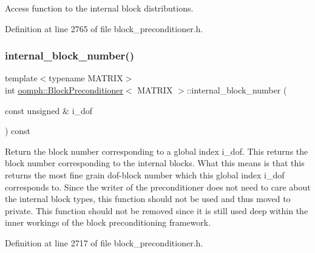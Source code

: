 Access function to the internal block distributions. 



Definition at line 2765 of file block\+\_\+preconditioner.\+h.

\mbox{\label{classoomph_1_1BlockPreconditioner_af3eadb5d8d36200c4738537eac1647a6}} 
\subsubsection{\texorpdfstring{internal\+\_\+block\+\_\+number()}{internal\_block\_number()}}
{\footnotesize\ttfamily template$<$typename M\+A\+T\+R\+IX$>$ \\
int \hyperlink{classoomph_1_1BlockPreconditioner}{oomph\+::\+Block\+Preconditioner}$<$ M\+A\+T\+R\+IX $>$\+::internal\+\_\+block\+\_\+number (\begin{DoxyParamCaption}\item[{const unsigned \&}]{i\+\_\+dof }\end{DoxyParamCaption}) const\hspace{0.3cm}{\ttfamily [inline]}}



Return the block number corresponding to a global index i\+\_\+dof. This returns the block number corresponding to the internal blocks. What this means is that this returns the most fine grain dof-\/block number which this global index i\+\_\+dof corresponds to. Since the writer of the preconditioner does not need to care about the internal block types, this function should not be used and thus moved to private. This function should not be removed since it is still used deep within the inner workings of the block preconditioning framework. 



Definition at line 2717 of file block\+\_\+preconditioner.\+h.

\mbox{\label{classoomph_1_1BlockPreconditioner_abe03c970690224b46a29e55e16992dd7}} 
